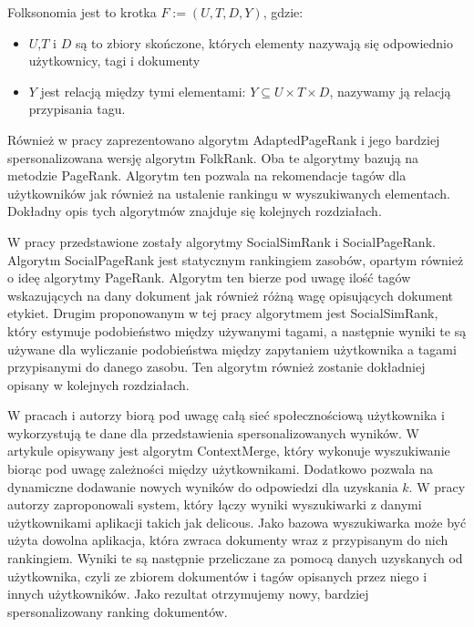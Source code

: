 \begin{definicja}
Folksonomia jest to krotka $F := (U,T,D,Y )$, gdzie:
\begin{itemize}
\item $U$,$T$ i $D$ są to zbiory skończone, których elementy nazywają się odpowiednio użytkownicy, tagi i dokumenty
\item $Y$ jest relacją między tymi elementami: $Y \subseteq  U \times T \times D $, nazywamy ją relacją przypisania tagu.

\end{itemize}
\end{definicja}


Również w  pracy \cite{hotho2006information} zaprezentowano algorytm AdaptedPageRank i jego bardziej spersonalizowana wersję algorytm FolkRank. Oba te algorytmy bazują na metodzie PageRank. Algorytm ten pozwala na rekomendacje tagów dla użytkowników jak również na ustalenie rankingu w wyszukiwanych elementach. Dokładny opis tych algorytmów znajduje się kolejnych rozdziałach.

W pracy \cite{bao2007social} przedstawione zostały algorytmy SocialSimRank i SocialPageRank. Algorytm SocialPageRank jest statycznym rankingiem zasobów, opartym również o ideę algorytmy PageRank. Algorytm ten bierze pod uwagę ilość tagów wskazujących na dany dokument jak również różną wagę opisujących dokument etykiet. Drugim proponowanym w tej pracy algorytmem jest SocialSimRank, który estymuje podobieństwo między używanymi tagami, a następnie wyniki te są używane dla wyliczanie podobieństwa między zapytaniem użytkownika a tagami przypisanymi do danego zasobu. Ten algorytm również zostanie dokładniej opisany w kolejnych rozdziałach.

W pracach \cite{citeulike:3063696} i \cite{citeulike:3423905} autorzy biorą pod uwagę całą sieć społecznościową użytkownika i wykorzystują te dane dla przedstawienia spersonalizowanych wyników. W artykule \cite{citeulike:3063696} opisywany jest algorytm ContextMerge, który wykonuje wyszukiwanie biorąc pod uwagę zależności między użytkownikami.  Dodatkowo pozwala na dynamiczne dodawanie nowych wyników do odpowiedzi dla uzyskania $k$. W pracy \cite{citeulike:3423905} autorzy zaproponowali system, który łączy wyniki wyszukiwarki z danymi użytkownikami aplikacji takich jak delicous. Jako bazowa wyszukiwarka może być użyta dowolna aplikacja, która zwraca dokumenty wraz z przypisanym do nich rankingiem. Wyniki te są następnie przeliczane za pomocą danych uzyskanych od użytkownika, czyli ze zbiorem dokumentów i tagów opisanych przez niego i innych użytkowników. Jako rezultat otrzymujemy nowy, bardziej spersonalizowany ranking dokumentów.

